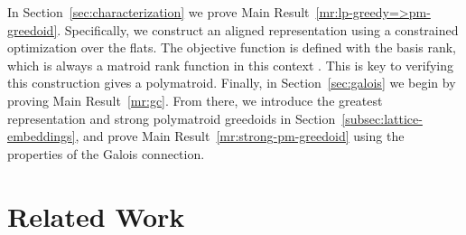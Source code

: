 \documentclass[11pt]{article}
\begin{document}
In Section~\ref{sec:characterization} we prove Main Result~\ref{mr:lp-greedy=>pm-greedoid}.
Specifically, we construct an aligned representation using a constrained optimization over the flats.
The objective function is defined with the basis rank, which is always a matroid rank function in this context \cite{korte1984greedoids}.
This is key to verifying this construction gives a polymatroid.
Finally, in Section~\ref{sec:galois} we begin by proving Main Result~\ref{mr:gc}.
From there, we introduce the greatest representation and strong polymatroid greedoids in Section~\ref{subsec:lattice-embeddings}, and prove Main Result~\ref{mr:strong-pm-greedoid} using the properties of the Galois connection.

\section{Related Work}\label{sec:related-work}
\end{document}
